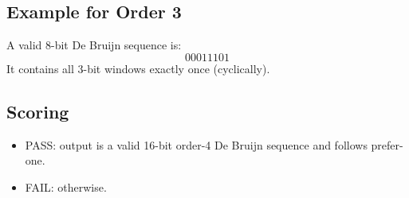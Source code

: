 \subsection*{Example for Order 3}
A valid 8-bit De Bruijn sequence is:
\[
00011101
\]
It contains all 3-bit windows exactly once (cyclically).

\subsection*{Scoring}
\begin{itemize}
  \item PASS: output is a valid 16-bit order-4 De Bruijn sequence and follows prefer-one.
  \item FAIL: otherwise.
\end{itemize}
